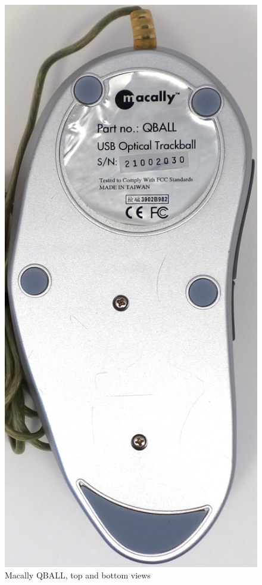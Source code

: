\documentclass[11pt, a4paper]{article}
\begin{document}
\begin{figure}[h]
    \includegraphics[scale=0.45]{2001_macally_qball/bottom_30.jpg}
    \caption{Macally QBALL, top and bottom views}
    \label{fig:MacallyQBALLTopBottom}
\end{figure}
\end{document}
